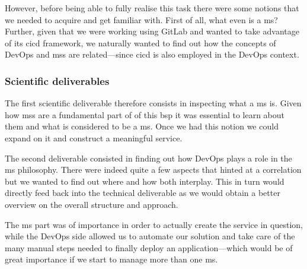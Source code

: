 
However, before being able to fully realise this task there were some
notions that we needed to acquire and get familiar with. First of all,
what even is a \gls{ms}? Further, given that we were working using
GitLab and wanted to take advantage of its \gls{cicd} framework, we
naturally wanted to find out how the concepts of DevOps and \glspl{ms}
are related---since \gls{cicd} is also employed in the DevOps context.



\subsubsection{Scientific deliverables}

The first scientific deliverable therefore consists in inspecting
what a \gls{ms} is. Given how \glspl{ms} are a fundamental part of of
this \gls{bsp} it was essential to learn about them and what is
considered to be a \gls{ms}. Once we had this notion we could expand
on it and construct a meaningful service.

The second deliverable consisted in finding out how DevOps plays a
role in the \gls{ms} philosophy. There were indeed quite a few aspects
that hinted at a correlation but we wanted to find out where and how
both interplay. This in turn would directly feed back into the
technical deliverable as we would obtain a better overview on the
overall structure and approach.

The \gls{ms} part was of importance in order to actually create the
service in question, while the DevOps side allowed us to automate our
solution and take care of the many manual steps needed to finally
deploy an application---which would be of great importance if we start
to manage more than one \gls{ms}.


